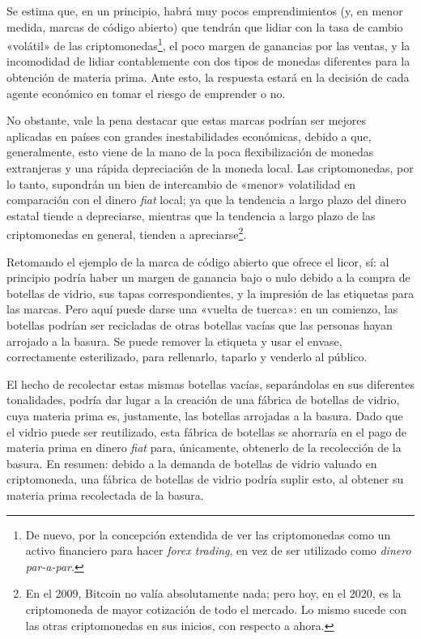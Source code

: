 \documentclass[12pt,a4paper]{article}
\begin{document}
Se estima que, en un principio, habrá muy pocos emprendimientos (y, en menor medida, marcas de código abierto) que tendrán que lidiar con la tasa de cambio «volátil» de las criptomonedas\footnote{De nuevo, por la concepción extendida de ver las criptomonedas como un activo financiero para hacer \textit{forex trading}, en vez de ser utilizado como \textit{dinero par-a-par}.}, el poco margen de ganancias por las ventas, y la incomodidad de lidiar contablemente con dos tipos de monedas diferentes para la obtención de materia prima. Ante esto, la respuesta estará en la decisión de cada agente económico en tomar el riesgo de emprender o no.

No obstante, vale la pena destacar que estas marcas podrían ser mejores aplicadas en países con grandes inestabilidades económicas, debido a que, generalmente, esto viene de la mano de la poca flexibilización de monedas extranjeras y una rápida depreciación de la moneda local. Las criptomonedas, por lo tanto, supondrán un bien de intercambio de «menor» volatilidad en comparación con el dinero \textit{fiat} local; ya que la tendencia a largo plazo del dinero estatal tiende a depreciarse, mientras que la tendencia a largo plazo de las criptomonedas en general, tienden a apreciarse\footnote{En el 2009, Bitcoin no valía absolutamente nada; pero hoy, en el 2020, es la criptomoneda de mayor cotización de todo el mercado. Lo mismo sucede con las otras criptomonedas en sus inicios, con respecto a ahora.}.

Retomando el ejemplo de la marca de código abierto que ofrece el licor, sí: al principio podría haber un margen de ganancia bajo o nulo debido a la compra de botellas de vidrio, sus tapas correspondientes, y la impresión de las etiquetas para las marcas. Pero aquí puede darse una «vuelta de tuerca»: en un comienzo, las botellas podrían ser recicladas de otras botellas vacías que las personas hayan arrojado a la basura. Se puede remover la etiqueta y usar el envase, correctamente esterilizado, para rellenarlo, taparlo y venderlo al público.

El hecho de recolectar estas mismas botellas vacías, separándolas en sus diferentes tonalidades, podría dar lugar a la creación de una fábrica de botellas de vidrio, cuya materia prima es, justamente, las botellas arrojadas a la basura. Dado que el vidrio puede ser reutilizado, esta fábrica de botellas se ahorraría en el pago de materia prima en dinero \textit{fiat} para, únicamente, obtenerlo de la recolección de la basura. En resumen: debido a la demanda de botellas de vidrio valuado en criptomoneda, una fábrica de botellas de vidrio podría suplir esto, al obtener su materia prima recolectada de la basura.
\end{document}

